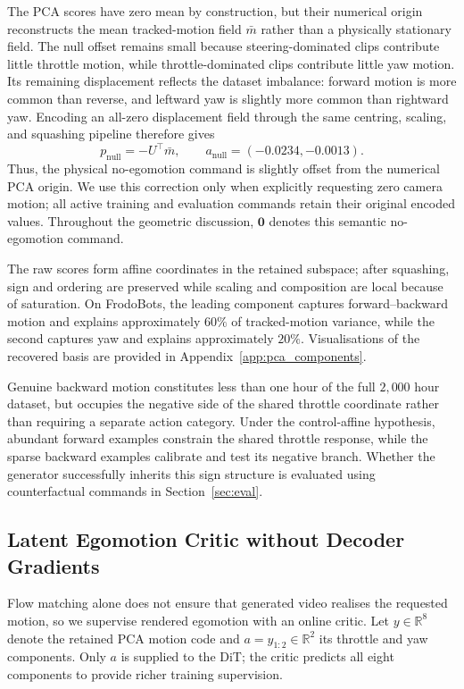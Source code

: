 \documentclass[letterpaper]{article} %
\begin{document}
The PCA scores have zero mean by construction, but their numerical origin
reconstructs the mean tracked-motion field $\bar m$ rather than a physically
stationary field. The null offset remains small because steering-dominated
clips contribute little throttle motion, while throttle-dominated clips
contribute little yaw motion. Its remaining displacement reflects the dataset
imbalance: forward motion is more common than reverse, and leftward yaw is
slightly more common than rightward yaw. Encoding an all-zero displacement
field through the same centring, scaling, and squashing pipeline therefore
gives
\begin{equation}
    p_{\mathrm{null}}=-U^\top\bar m,
    \qquad
    a_{\mathrm{null}}=(-0.0234,-0.0013).
    \label{eq:null_action}
\end{equation}
Thus, the physical no-egomotion command is slightly offset from the numerical
PCA origin. We use this correction only when explicitly requesting zero camera
motion; all active training and evaluation commands retain their original
encoded values. Throughout the geometric discussion, $\mathbf{0}$ denotes this
semantic no-egomotion command.

The raw scores form affine coordinates in the retained subspace; after
squashing, sign and ordering are preserved while scaling and composition are
local because of saturation. On FrodoBots, the leading component captures
forward--backward motion and explains approximately $60\%$ of tracked-motion
variance, while the second captures yaw and explains approximately $20\%$.
Visualisations of the recovered basis are provided in
Appendix~\ref{app:pca_components}.

Genuine backward motion constitutes less than one hour of the full
$2{,}000$ hour dataset, but occupies the negative side of the shared
throttle coordinate rather than requiring a separate action category.
Under the control-affine hypothesis, abundant forward examples constrain the
shared throttle response, while the sparse backward examples calibrate and
test its negative branch. Whether the generator successfully
inherits this sign structure is evaluated using counterfactual commands in
Section~\ref{sec:eval}.

\subsection{Latent Egomotion Critic without Decoder Gradients}
\label{sec:critic}

Flow matching alone does not ensure that generated video realises the requested
motion, so we supervise rendered egomotion with an online critic. Let
$y\in\mathbb{R}^{8}$ denote the retained PCA motion code and
$a=y_{1:2}\in\mathbb{R}^{2}$ its throttle and yaw components. Only $a$ is
supplied to the DiT; the critic predicts all eight components to provide richer
training supervision.
\end{document}
